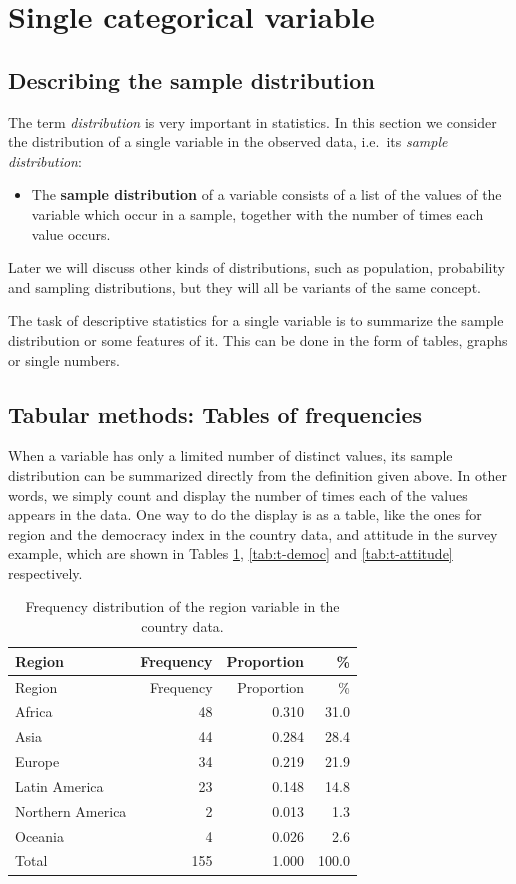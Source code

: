 \documentclass[11pt,a4paper,openany]{book}
\providecommand{\tightlist}{%
  \setlength{\itemsep}{0pt}\setlength{\parskip}{0pt}}
\begin{document}
\section{Single categorical variable}\label{s-descr1-1cat}

\subsection{Describing the sample
distribution}\label{ss-descr1-1cat-distr}

The term \emph{distribution} is very important in statistics. In this
section we consider the distribution of a single variable in the
observed data, i.e.~its \emph{sample distribution}:

\begin{itemize}
\tightlist
\item
  The \textbf{sample distribution} of a variable consists of a list of
  the values of the variable which occur in a sample, together with the
  number of times each value occurs.
\end{itemize}

Later we will discuss other kinds of distributions, such as population,
probability and sampling distributions, but they will all be variants of
the same concept.

The task of descriptive statistics for a single variable is to summarize
the sample distribution or some features of it. This can be done in the
form of tables, graphs or single numbers.

\subsection{Tabular methods: Tables of
frequencies}\label{ss-descr1-1cat-tables}

When a variable has only a limited number of distinct values, its sample
distribution can be summarized directly from the definition given above.
In other words, we simply count and display the number of times each of
the values appears in the data. One way to do the display is as a table,
like the ones for region and the democracy index in the country data,
and attitude in the survey example, which are shown in Tables
\ref{tab:t-region}, \ref{tab:t-democ} and \ref{tab:t-attitude}
respectively.

\begin{longtable}[]{@{}lrrr@{}}
\caption{\label{tab:t-region} Frequency distribution of the region variable
in the country data.}\tabularnewline
\toprule
Region & Frequency & Proportion & \%\tabularnewline
\midrule
\endfirsthead
\toprule
Region & Frequency & Proportion & \%\tabularnewline
\midrule
\endhead
Africa & 48 & 0.310 & 31.0\tabularnewline
Asia & 44 & 0.284 & 28.4\tabularnewline
Europe & 34 & 0.219 & 21.9\tabularnewline
Latin America & 23 & 0.148 & 14.8\tabularnewline
Northern America & 2 & 0.013 & 1.3\tabularnewline
Oceania & 4 & 0.026 & 2.6\tabularnewline
Total & 155 & 1.000 & 100.0\tabularnewline
\bottomrule
\end{longtable}
\end{document}
